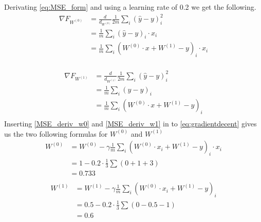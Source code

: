 \noindent Derivating \ref{eq:MSE_form} and using a learning rate of 0.2 we get the following. 
\begin{equation}
    \label{MSE_deriv_w0}
    \begin{split}
    \nabla F_{W^{(0)}} &= \frac{d}{d_{W^{(0)}} } \frac{1}{2m} \sum_i (\hat{y}-y)_i^2 \\
     &= \frac{1}{m} \sum_{i}{(\hat{y}-y)}_{i} \cdot x_i\\
     &= \frac{1}{m} \sum_{i}{(W^{(0)} \cdot x + W^{(1)}-y)}_{i} \cdot x_i\\
    \end{split}
\end{equation}

\begin{equation}
    \label{MSE_deriv_w1}
    \begin{split}
     \nabla F_{W^{(1)}} &= \frac{d}{d_{W^{(1)}} } \frac{1}{2m} \sum_i (\hat{y}-y)_i^2 \\
                    &= \frac{1}{m} \sum_{i}{(\hat{y}-y)}_{i} \\
                    &= \frac{1}{m} \sum_{i}{(W^{(0)} \cdot x + W^{(1)}-y)}_{i}\\
    \end{split}
\end{equation}
\noindent Inserting \ref{MSE_deriv_w0} and \ref{MSE_deriv_w1} in to \ref{eq:gradientdecent} gives us the two following formulas for $W^{(0)}$ and $W^{(1)}$
\begin{equation}
    \label{GD_W0}
    \begin{split}
    W^{(0)}  &= W^{(0)} - \gamma \frac{1}{m} \sum_{i}{(W^{(0)} \cdot x_i + W^{(1)}-y)}_{i} \cdot x_i \\
              &= 1 - 0.2 \cdot \frac{1}{3}  \sum (0+1+3)  \\
              &= 0.733\\
    \end{split}
\end{equation}
\begin{equation}
    \label{GD_W0}
    \begin{split}
    W^{(1)}  &= W^{(1)} - \gamma \frac{1}{m} \sum_{i}{(W^{(0)} \cdot x_i + W^{(1)}-y)}_{i} \\
              &= 0.5 - 0.2 \cdot \frac{1}{3} \sum (0-0.5-1) \\
              &= 0.6\\
    \end{split}
\end{equation}


